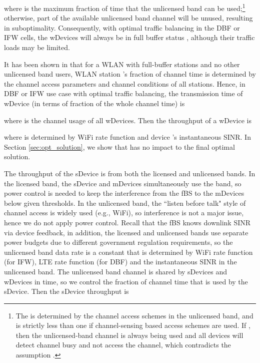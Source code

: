 \documentclass[journal,final,letterpaper,10pt,doublecolumn,twoside]{IEEEtran}
\begin{document}
where  is
the maximum fraction of time that the unlicensed
band can be used;\footnote{The  is determined by the channel
access schemes in the unlicensed band, and is strictly less than one
if channel-sensing based access schemes are used.  If
, then the unlicensed-band channel is always being used
and all devices will detect channel busy and not access the channel,
which contradicts the assumption .  } otherwise, part of the available unlicensed band channel will be unused, resulting in suboptimality. Consequently, with optimal traffic
balancing in the DBF or IFW cells, the wDevices will always be in full buffer status \cite{queuing-theory-textbook}, although their traffic loads may be limited.


It has been shown in
\cite{Bianchi,WiFi_modeling_Foh_freezingCounter,WiFi_analysis_freezingCounter_Lee2005Conf}  that for a WLAN with full-buffer stations and no other unlicensed band users,  WLAN station 's fraction of channel time  is determined by the channel access parameters and channel conditions of all stations. Hence, in DBF or IFW use case with optimal traffic  balancing,  the transmission time  of wDevice  (in terms of fraction of the whole channel time) is

where  is the channel usage of
all  wDevices.
Then the throughput of a wDevice is

where  is determined by WiFi rate function  and
device 's  instantaneous SINR. In Section \ref{sec:opt_solution}, we show that   has no impact to the final optimal solution.

The  throughput of the  sDevice  is from both the licensed and unlicensed bands. In the licensed band,  the sDevice and mDevices simultaneously use the band, so power control is needed to keep the interference from the fBS to the mDevices below given thresholds. In the unlicensed band, the ``listen before talk" style of channel access is widely used (e.g., WiFi), so interference is not a major issue, hence we do not apply power control.  Recall that the fBS knows downlink SINR via device feedback, in addition, the licensed and unlicensed bands use separate power budgets due to different government regulation requirements, so the unlicensed band data rate   is a constant that is determined by WiFi rate function  (for IFW), LTE rate function  (for DBF) and
 the instantaneous SINR in the unlicensed band. The unlicensed band channel is shared by sDevices and wDevices in time, so we control the fraction of channel time  that is used by the sDevice. Then the sDevice throughput is
\end{document}
